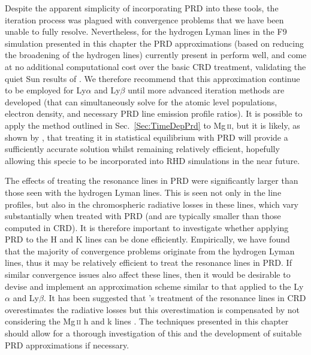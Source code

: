 Despite the apparent simplicity of incorporating PRD into these tools, the iteration process was plagued with convergence problems that we have been unable to fully resolve.
Nevertheless, for the hydrogen Lyman lines in the F9 simulation presented in this chapter the PRD approximations (based on reducing the broadening of the hydrogen lines) currently present in \Radyn{} perform well, and come at no additional computational cost over the basic CRD treatment, validating the quiet Sun results of \citet{Leenaarts2012a}.
We therefore recommend that this approximation continue to be employed for Ly$\alpha$ and Ly$\beta$ until more advanced iteration methods are developed (that can simultaneously solve for the atomic level populations, electron density, and necessary PRD line emission profile ratios).
It is possible to apply the method outlined in Sec.~\ref{Sec:TimeDepPrd} to Mg\,\textsc{ii}, but it is likely, as shown by \citet{Kerr2019}, that treating it in statistical equilibrium with PRD will provide a sufficiently accurate solution whilst remaining relatively efficient, hopefully allowing this specie to be incorporated into RHD simulations in the near future.

The effects of treating the \Caii{} resonance lines in PRD were significantly larger than those seen with the hydrogen Lyman lines.
This is seen not only in the line profiles, but also in the chromospheric radiative losses in these lines, which vary substantially when treated with PRD (and are typically smaller than those computed in CRD).
It is therefore important to investigate whether applying PRD to the H and K lines can be done efficiently.
Empirically, we have found that the majority of convergence problems originate from the hydrogen Lyman lines, thus it may be relatively efficient to treat the \Caii{} resonance lines in PRD.
If similar convergence issues also affect these lines, then it would be desirable to devise and implement an approximation scheme similar to that applied to the Ly$\alpha$ and Ly$\beta$.
It has been suggested that \Radyn{}'s treatment of the \Caii{} resonance lines in CRD overestimates the radiative losses but this overestimation is compensated by not considering the Mg\,\textsc{ii} h and k lines \citep[e.g.][]{Kerr2019a}.
The techniques presented in this chapter should allow for a thorough investigation of this and the development of suitable PRD approximations if necessary.
